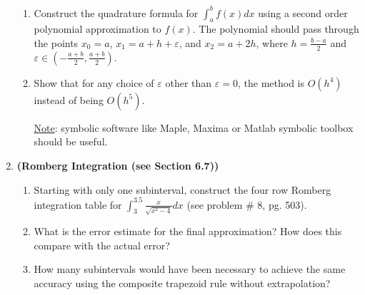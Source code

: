 \documentclass [12pt]{article}
\begin{document}
\begin{enumerate}
\begin{enumerate}

\item Construct the quadrature formula for $\int_a^{b} f(x) dx$
using a second order polynomial approximation to $f(x)$.
    The polynomial should pass through the points $x_0=a$,
    $x_1=a+h+\varepsilon$, and $x_2=a+2h$, where $h=\frac{b-a}{2}$ and
    $\varepsilon \in (-\frac{a+b}{2},\frac{a+b}{2})$.

\item Show that for any choice of $\varepsilon$ other than
    $\varepsilon=0$, the method is $O(h^4)$ instead of being $O(h^5)$.

\underline{Note}: symbolic software like Maple, Maxima or Matlab symbolic toolbox should be useful.
\end{enumerate}




\item \textbf{(Romberg Integration (see Section 6.7))} 

\begin{enumerate}

\item Starting with only one subinterval, construct the four row  Romberg integration table for $\int_{3}^{3.5} \frac{x}{\sqrt{x^2-4}}dx$ (see problem \# 8, pg. 503).

\item What is the error estimate for the final approximation? How does this compare with the actual error?

\item How many subintervals would have been necessary to achieve the same accuracy using the composite trapezoid rule without extrapolation?

\end{enumerate}

\end{enumerate}
\end{document}
